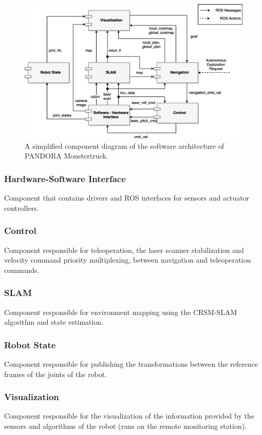 \documentclass[conference]{IEEEtran}
\begin{document}

\begin{figure}[!ht]
	\centering
	\includegraphics[width=\linewidth]{Figures/component_diagram.png}%
	\caption{A simplified component diagram of the software architecture of PANDORA Monstertruck.}
	\label{fig:component_diagram}
\end{figure}


\subsubsection{Hardware-Software Interface}
Component that contains drivers and ROS interfaces for sensors and actuator controllers.
\subsubsection{Control}
Component responsible for teleoperation, the laser scanner stabilization and velocity command priority multiplexing, between navigation and teleoperation commands.
\subsubsection{SLAM}
Component responsible for environment mapping using the CRSM-SLAM algorithm and state estimation.
\subsubsection{Robot State}
Component responsible for publishing the transformations between the reference frames of the joints of the robot.
\subsubsection{Visualization}
Component responsible for the visualization of the information provided by the sensors and algorithms of the robot (runs on the remote monitoring station).
\end{document}
